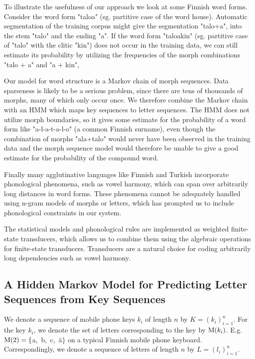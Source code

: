 \documentclass{llncs}
\begin{document}
To illustrate the usefulness of our approach we look at some Finnish
word forms. Consider the word form "taloa" (sg. partitive case of
the word house). Automatic segmentation of the training corpus might
give the segmentation "talo+a", into the stem "talo" and the ending
"a". If the word form "taloakin" (sg. partitive case of "talo" with
the clitic "kin") does not occur in the training data, we can still
estimate its probability by utilizing the frequencies of the morph
combinations "talo + a" and "a + kin",

Our model for word structure is a Markov chain of morph
sequences. Data sparseness is likely to be a serious problem, since
there are tens of thousands of morphs, many of which only occur
once. We therefore combine the Markov chain with an
HMM which maps key sequences to letter sequences. The HMM does not
utilize morph boundaries, so it gives some estimate for the
probability of a word form like "a-l-a-t-a-l-o" (a common Finnish
surname), even though the combination of morphs "ala+talo" would never
have been observed in the training data and the morph sequence model
would therefore be unable to give a good estimate for the probability
of the compound word.

Finally many agglutinative languages like Finnish and Turkish
incorporate phonological phenomena, such as vowel harmony, which can
span over arbitrarily long distances in word forms. These phenomena
cannot be adequately handled using n-gram models of morphs or letters,
which has prompted us to include phonological constraints in our
system.

The statistical models and phonological rules are implemented as
weighted finite-state transducers, which allows us to combine them using
the algebraic operations for finite-state transducers. Transducers are
a natural choice for coding arbitrarily long dependencies such as
vowel harmony.

\subsection{A Hidden Markov Model for Predicting Letter Sequences from Key Sequences}

We denote a sequence of mobile phone keys $k_i$ of length $n$ by $K =
(k_i)_{i=1}^{n}$. For the key $k_i$, we denote the set of letters
corresponding to the key by ${\rm M}(k_i)$. E.g. ${\rm M}(2) =
\{$a,~b,~c,~\"{a}$\}$ on a typical Finnish mobile phone
keyboard. Correspondingly, we denote a sequence of letters of length
$n$ by $L = (l_i)_{i=1}^{n}$.
\end{document}
